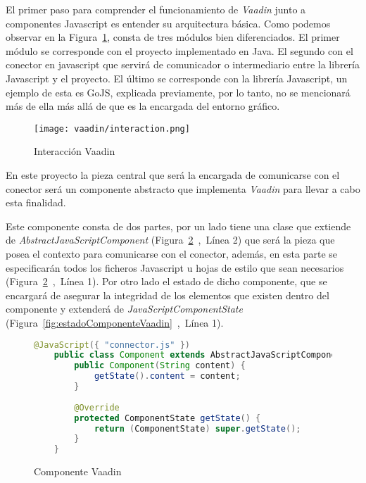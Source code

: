 El primer paso para comprender el funcionamiento de \emph{Vaadin} junto a componentes Javascript es entender su arquitectura básica. Como podemos observar en la Figura~\ref{fig:interaction}, consta de tres módulos bien diferenciados. El primer módulo se corresponde con el proyecto implementado en Java. El segundo con el conector en javascript que servirá de comunicador o intermediario entre la librería Javascript y el proyecto. El último se corresponde con la librería Javascript, un ejemplo de esta es GoJS, explicada previamente, por lo tanto, no se mencionará más de ella más allá de que es la encargada del entorno gráfico.



\begin{figure}[!tb]
	\centering
	\texttt{[image: vaadin/interaction.png]}
	\caption{Interacción Vaadin}\label{fig:interaction}
\end{figure}




En este proyecto la pieza central que será la encargada de comunicarse con el conector será un componente abstracto que implementa \emph{Vaadin} para llevar a cabo esta finalidad.

Este componente consta de dos partes, por un lado tiene una clase que extiende de \emph{AbstractJavaScriptComponent} (Figura~\ref{fig:componenteVaadin}~,~Línea 2) que será la pieza que posea el contexto para comunicarse con el conector, además, en esta parte se especificarán todos los ficheros Javascript u hojas de estilo que sean necesarios (Figura~\ref{fig:componenteVaadin}~,~Línea 1). Por otro lado el estado de dicho componente, que se encargará de asegurar la integridad de los elementos que existen dentro del componente y extenderá de \emph{JavaScriptComponentState} (Figura~\ref{fig:estadoComponenteVaadin}~,~Línea 1).

\begin{figure}[!tb]
	\centering
	\begin{lstlisting}[language=Java]
	@JavaScript({ "connector.js" })
	public class Component extends AbstractJavaScriptComponent {
		public Component(String content) {
			getState().content = content;
		}
		
		@Override
		protected ComponentState getState() {
			return (ComponentState) super.getState();
		}
	}\end{lstlisting}
	\caption{Componente Vaadin}
	\label{fig:componenteVaadin}
\end{figure}


